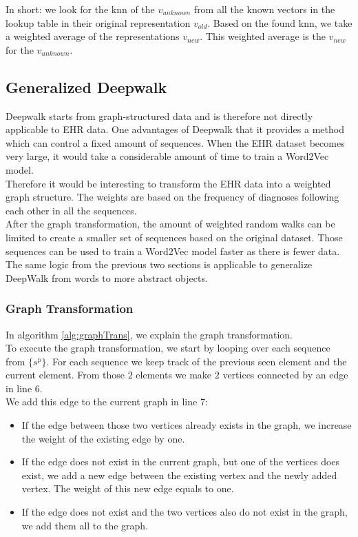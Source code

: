 In short: we look for the knn of the $v_{unknown}$ from all the known vectors in the lookup table in their original representation $v_{old}$. Based on the found knn, we take a weighted average of the representations $v_{new}$. This weighted average is the $v_{new}$ for the $v_{unknown}$.

\subsection{Generalized Deepwalk}
\label{sec:genDW}

Deepwalk starts from graph-structured data and is therefore not directly applicable to EHR data. One advantages of Deepwalk that it provides a method which can control a fixed amount of sequences. When the EHR dataset becomes very large, it would take a considerable amount of time to train a Word2Vec model. \\

Therefore it would be interesting to transform the EHR data into a weighted graph structure. The weights are based on the frequency of diagnoses following each other in all the sequences. \\
After the graph transformation, the amount of weighted random walks can be limited to create a smaller set of sequences based on the original dataset. Those sequences can be used to train a Word2Vec model faster as there is fewer data. The same logic from the previous two sections is applicable to generalize DeepWalk from words to more abstract objects.

\subsubsection{Graph Transformation}

In algorithm \ref{alg:graphTrans}, we explain the graph transformation. \\
To execute the graph transformation, we start by looping over each sequence from $\{s^p\}$. For each sequence we keep track of the previous seen element and the current element. From those $2$ elements we make $2$ vertices connected by an edge in line 6. \\
We add this edge to the current graph in line 7:

\begin{itemize}

\item If the edge between those two vertices already exists in the graph, we increase the weight of the existing edge by one.

\item If the edge does not exist in the current graph, but one of the vertices does exist, we add a new edge between the existing vertex and the newly added vertex. The weight of this new edge equals to one.

\item If the edge does not exist and the two vertices also do not exist in the graph, we add them all to the graph.

\end{itemize}


